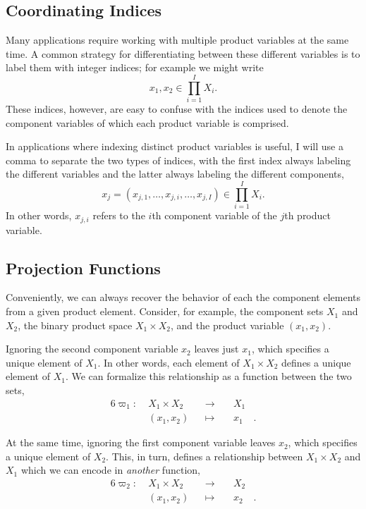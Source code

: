 \documentclass[
  letterpaper,
  DIV=11,
  numbers=noendperiod]{scrartcl}
\begin{document}
\subsection{Coordinating Indices}\label{coordinating-indices}

Many applications require working with multiple product variables at the
same time. A common strategy for differentiating between these different
variables is to label them with integer indices; for example we might
write \[
x_{1}, x_{2} \in \prod_{i = 1}^{I} X_{i}.
\] These indices, however, are easy to confuse with the indices used to
denote the component variables of which each product variable is
comprised.

In applications where indexing distinct product variables is useful, I
will use a comma to separate the two types of indices, with the first
index always labeling the different variables and the latter always
labeling the different components, \[
x_{j}
=
( x_{j, 1}, \ldots, x_{j, i}, \ldots, x_{j, I})
\in
\prod_{i = 1}^{I} X_{i}.
\] In other words, \(x_{j, i}\) refers to the \(i\)th component variable
of the \(j\)th product variable.

\subsection{Projection Functions}\label{projection-functions}

Conveniently, we can always recover the behavior of each the component
elements from a given product element. Consider, for example, the
component sets \(X_{1}\) and \(X_{2}\), the binary product space
\(X_{1} \times X_{2}\), and the product variable \(( x_{1}, x_{2} )\).

Ignoring the second component variable \(x_{2}\) leaves just \(x_{1}\),
which specifies a unique element of \(X_{1}\). In other words, each
element of \(X_{1} \times X_{2}\) defines a unique element of \(X_{1}\).
We can formalize this relationship as a function between the two sets,
\begin{alignat*}{6}
\varpi_{1} :\; & X_{1} \times X_{2} & &\rightarrow& \; & X_{1} &
\\
& (x_{1}, x_{2}) & &\mapsto& & x_{1} &.
\end{alignat*}

At the same time, ignoring the first component variable leaves
\(x_{2}\), which specifies a unique element of \(X_{2}\). This, in turn,
defines a relationship between \(X_{1} \times X_{2}\) and \(X_{1}\)
which we can encode in \emph{another} function, \begin{alignat*}{6}
\varpi_{2} :\; & X_{1} \times X_{2} & &\rightarrow& \; & X_{2} &
\\
& (x_{1}, x_{2}) & &\mapsto& & x_{2} &.
\end{alignat*}
\end{document}

